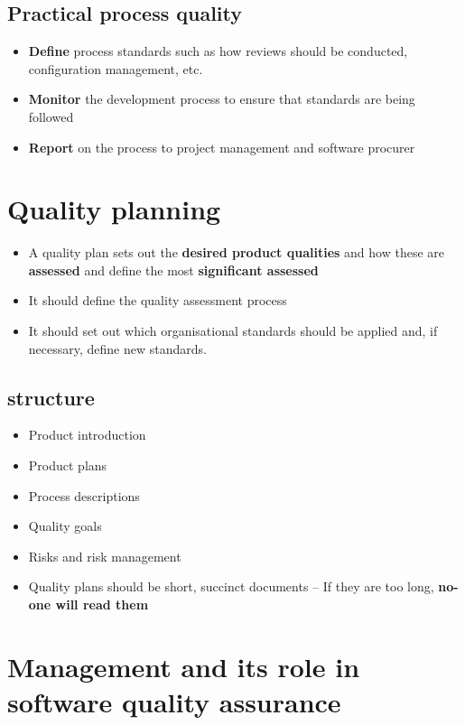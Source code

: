 \documentclass{article}
\begin{document}
\subsection{Practical process quality}

\begin{itemize}
  \item \textbf{Define} process standards such as how reviews should be conducted,
configuration management, etc.
  \item \textbf{Monitor} the development process to ensure that standards are being followed
  \item \textbf{Report} on the process to project management and software procurer
\end{itemize}

\section{Quality planning}

\begin{itemize}
  \item A quality plan sets out the \textbf{desired product qualities} and how these are \textbf{assessed} and define the most \textbf{significant assessed}
  \item It should define the quality assessment process
  \item It should set out which organisational standards should be applied and, if necessary, define new standards.
\end{itemize}

\subsection{structure}

\begin{itemize}
  \item Product introduction
  \item Product plans
  \item Process descriptions
  \item Quality goals
  \item Risks and risk management
  \item Quality plans should be short, succinct documents – If they are too long, \textbf{no-one will read them}
\end{itemize}

\section{Management and its role in software quality assurance}
\end{document}
